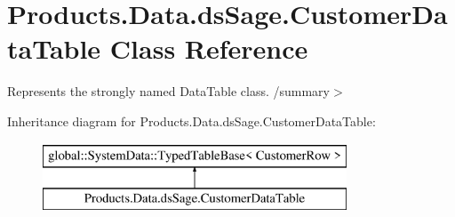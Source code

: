 \hypertarget{class_products_1_1_data_1_1ds_sage_1_1_customer_data_table}{}\section{Products.\+Data.\+ds\+Sage.\+Customer\+Data\+Table Class Reference}
\label{class_products_1_1_data_1_1ds_sage_1_1_customer_data_table}


Represents the strongly named Data\+Table class. /summary$>$  


Inheritance diagram for Products.\+Data.\+ds\+Sage.\+Customer\+Data\+Table\+:\begin{figure}[H]
\begin{center}
\leavevmode
\includegraphics[height=2.000000cm]{class_products_1_1_data_1_1ds_sage_1_1_customer_data_table}
\end{center}
\end{figure}
